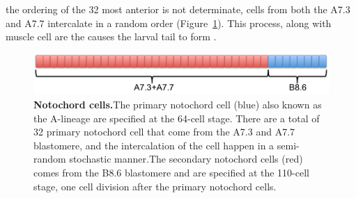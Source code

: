 the ordering of the 32 most anterior is not determinate, cells from both the A7.3 and A7.7 intercalate in a random order (Figure~\ref{fig:noto_cells})\cite{nishida_cell_1983,nishida_cell_1985,miyamoto_formation_1985, swalla_mechanisms_1993,kourakis_one-dimensional_2014}. This process, along with muscle cell are the causes the larval tail to form \cite{miyamoto_formation_1985, jeffery_factors_1992,swalla_mechanisms_1993}.

\begin{figure}[tbp]
\centering
\includegraphics[scale=0.5]{figures/noto_cells.pdf}
\caption{\textbf{Notochord cells.}The primary notochord cell (blue) also known as the A-lineage are specified at the 64-cell stage. There are a total of 32 primary notochord cell that come from the A7.3 and A7.7 blastomere, and the intercalation of the cell happen in a semi-random stochastic manner.The secondary notochord cells (red) comes from the B8.6 blastomere and are specified at the 110-cell stage, one cell division after the primary notochord cells.}
\label{fig:noto_cells}
\end{figure}

